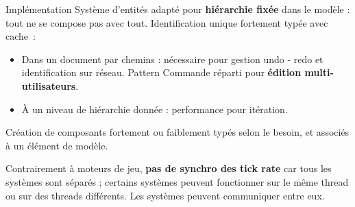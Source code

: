 \begin{block}{Implémentation}
Système d'entités adapté pour \textbf{hiérarchie fixée} dans le modèle : tout ne se compose pas avec tout.
Identification unique fortement typée avec cache~: 
\begin{itemize}
    \item Dans un document par chemins : nécessaire pour gestion undo - redo et identification sur réseau.
    Pattern Commande réparti pour \textbf{édition multi-utilisateurs}.
    \item À un niveau de hiérarchie donnée : performance pour itération.
   \end{itemize}

Création de composants fortement ou faiblement typés selon le besoin, et associés à un élément de modèle.

Contrairement à moteurs de jeu, \textbf{pas de synchro des tick rate} car tous les systèmes sont séparés ; certains systèmes peuvent fonctionner sur le même thread ou sur des threads différents. 
Les systèmes peuvent communiquer entre eux.
\end{block}